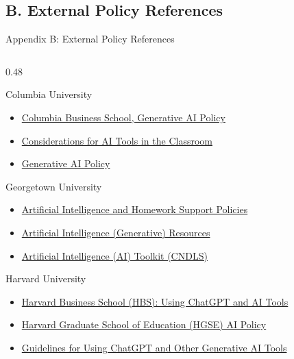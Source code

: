 \documentclass[aspectratio=169]{beamer}
\begin{document}
\subsection{B. External Policy References}

\begin{frame}[t]{Appendix B: External Policy References}\label{external_policies}
\tiny
\begin{columns}[t]

  \begin{column}{0.48\textwidth}

Columbia University
\begin{itemize}
  \item \href{https://students.business.columbia.edu/office-of-student-affairs/academic-advising-and-student-success/academic-integrity/generative-ai-policy}{Columbia Business School, Generative AI Policy}
  \item \href{https://ctl.columbia.edu/resources-and-technology/resources/ai-tools/}{Considerations for AI Tools in the Classroom}
  \item \href{https://provost.columbia.edu/content/office-senior-vice-provost/ai-policy}{Generative AI Policy}
\end{itemize}

Georgetown University
\begin{itemize}
  \item \href{https://cndls.georgetown.edu/resources/syllabus-policies/ai-and-homework-support/}{Artificial Intelligence and Homework Support Policies}
  \item \href{https://guides.library.georgetown.edu/ai}{Artificial Intelligence (Generative) Resources}
  \item \href{https://cndls.georgetown.edu/resources/ai/}{Artificial Intelligence (AI) Toolkit (CNDLS)}
\end{itemize}

Harvard University
\begin{itemize}
  \item \href{https://www.hbs.edu/mba/handbook/standards-of-conduct/academic/Pages/chatgpt-and-ai.aspx}{Harvard Business School (HBS): Using ChatGPT and AI Tools}
  \item \href{https://registrar.gse.harvard.edu/AI-policy}{Harvard Graduate School of Education (HGSE) AI Policy}
  \item \href{https://provost.harvard.edu/guidelines-using-chatgpt-and-other-generative-ai-tools-harvard}{Guidelines for Using ChatGPT and Other Generative AI Tools}
\end{itemize}


\end{column}
\end{columns}
\end{frame}
\end{document}
